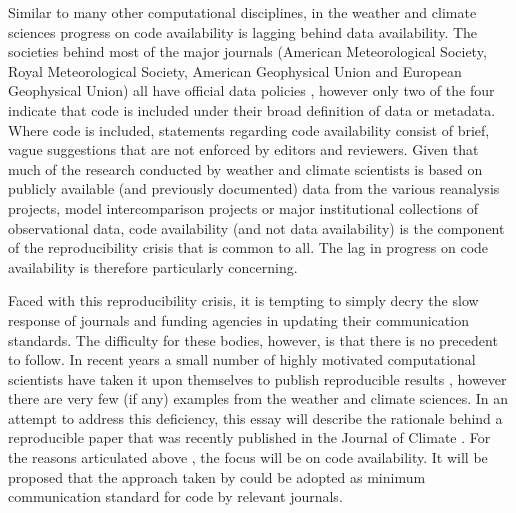 Similar to many other computational disciplines, in the weather and climate sciences progress on code availability is lagging behind data availability. The societies behind most of the major journals (American Meteorological Society, Royal Meteorological Society, American Geophysical Union and European Geophysical Union) all have official data policies \citep[e.g.][]{Mayernik2015}, however only two of the four indicate that code is included under their broad definition of data or metadata. Where code is included, statements regarding code availability consist of brief, vague suggestions that are not enforced by editors and reviewers. Given that much of the research conducted by weather and climate scientists is based on publicly available (and previously documented) data from the various reanalysis projects, model intercomparison projects or major institutional collections of observational data, code availability (and not data availability) is the component of the reproducibility crisis that is common to all. The lag in progress on code availability is therefore particularly concerning. 

Faced with this reproducibility crisis, it is tempting to simply decry the slow response of journals and funding agencies in updating their communication standards. The difficulty for these bodies, however, is that there is no precedent to follow. In recent years a small number of highly motivated computational scientists have taken it upon themselves to publish reproducible results \citep[e.g.][]{Crooks2014,Ketcheson2012,Schmitt2015}, however there are very few (if any) examples from the weather and climate sciences. In an attempt to address this deficiency, this essay will describe the rationale behind a reproducible paper that was recently published in the Journal of Climate \citep{Irving2016}. For the reasons articulated above \citep[and the fact that data availability was already addressed in a recent BAMS essay;][]{Mayernik2015a}, the focus will be on code availability. It will be proposed that the approach taken by \citet{Irving2016} could be adopted as minimum communication standard for code by relevant journals.  

  